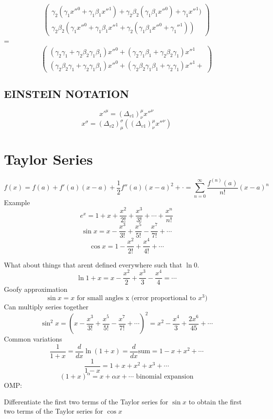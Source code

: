 \documentclass{report}
\begin{document}
\[
\begin{pmatrix}
\gamma_2 (\gamma_1x''^0 + \gamma_1 \beta_1 x''^1) + 
\gamma_2 \beta_2 (\gamma_1 \beta_1 x''^0) + \gamma_1 x''^1)
\\
\gamma_2 \beta_2 (\gamma_1 x''^0 + \gamma_1 \beta_1 x''^1 + 
\gamma_2 (\gamma_1 \beta_1 x''^0 + \gamma_1 ''^1))
\end{pmatrix}
\]
=
\[
\begin{pmatrix}
(\gamma_2 \gamma_1 + \gamma_2 \beta_2 \gamma_1 \beta_1) x''^0 + 
(\gamma_2 \gamma_1 \beta_1 + \gamma_2 \beta_2 \gamma_1) x''^1
\\
(\gamma_2 \beta_2 \gamma_1 + \gamma_2 \gamma_1 \beta_1)x''^0 +
(\gamma_2 \beta_2 \gamma_1 \beta_1 + \gamma_2 \gamma_1)x''^1 +
\end{pmatrix}
\]

\subsection{EINSTEIN NOTATION}
\[
x'^\mu = (\Delta_{v1})^\mu_\nu x''^\nu
\]
\[
x^\sigma = (\Delta_{v2})^\sigma_\mu ((\Delta_{v1})^\mu_\nu x''^\nu )
\]


\section{Taylor Series}
\[
f(x) = f(a) + f'(a)(x-a) + \frac{1}{2}f''(a)(x-a)^2 + \cdot = \sum^\infty_{n=0} \frac{f^{(n)}(a)}{n!}(x-a)^n
\]
Example
\[
e^x = 1 + x + \frac{x^2}{2!} + \frac{x^3}{3!} + \cdots + \frac{x^n}{n!}
\]
\[
\sin x = x - \frac{x^3}{3!} + \frac{x^5}{5!} - \frac{x^7}{7!} + \cdots
\]
\[
\cos x = 1 - \frac{x^2}{2!} + \frac{x^4}{4!} + \cdots
\]

What about things that arent defined everywhere such that $\ln 0$.
\[
\ln 1+x = x - \frac{x^2}{2} + \frac{x^3}{3} - \frac{x^4}{4} = \cdots
\]
Goofy approximation
\[
\sin x = x \textrm{ for small angles x (error proportional to $x^3$)}
\]
Can multiply series together
\[
\sin^2 x = \left(x - \frac{x^3}{3!} + \frac{x^5}{5!} - \frac{x^7}{7!} + \cdots \right)^2
=
x^2 - \frac{x^4}{3} + \frac{2x^6}{45} + \cdots
\]
Common variations
\[
\frac{1}{1+x} = \frac{d}{dx} \ln (1 + x) = \frac{d}{dx} \textrm{sum} = 1 - x + x^2 + \cdots
\]
\[
\frac{1}{1-x} = 1+x+x^2+x^3 + \cdots
\]
\[
(1+x)^\alpha = x + \alpha x + \cdots \textrm{ binomial expansion}
\]
OMP:

Differentiate the first two terms of the Taylor series for $\sin x$ to obtain the first two terms of the Taylor series for $\cos x$
\end{document}
